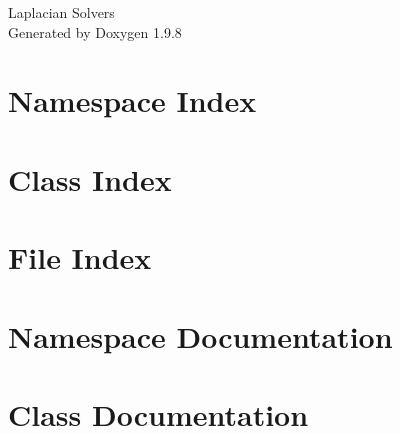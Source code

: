 \documentclass[twoside]{book}
\newcommand{\+}{\discretionary{\mbox{\scriptsize$\hookleftarrow$}}{}{}}
\newcommand{\clearemptydoublepage}{%
    \newpage{\pagestyle{empty}\cleardoublepage}%
  }
\begin{document}
  \raggedbottom
    \hypersetup{pageanchor=false,
                bookmarksnumbered=true,
                pdfencoding=unicode
               }
  \begin{titlepage}
  \vspace*{7cm}
  \begin{center}%
  {\Large Laplacian Solvers}\\
  \vspace*{1cm}
  {\large Generated by Doxygen 1.9.8}\\
  \end{center}
  \end{titlepage}
  \clearemptydoublepage
  \tableofcontents
  \clearemptydoublepage
  \hypersetup{pageanchor=true}


\chapter{Namespace Index}

\chapter{Class Index}

\chapter{File Index}

\chapter{Namespace Documentation}

\chapter{Class Documentation}





\end{document}
